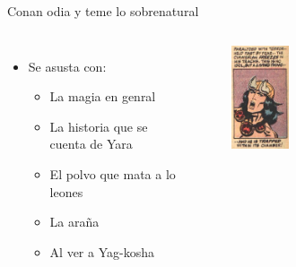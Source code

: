 \begin{frame}{Conan odia y teme lo sobrenatural}
\begin{columns}
 \begin{itemize}
    \item Se asusta con:
    \begin{itemize}
      \item La magia en genral
      \item La historia que se cuenta de Yara
      \item El polvo que mata a lo leones
      \item La araña
      \item Al ver a Yag-kosha
    \end{itemize}
 \end{itemize}
 \begin{figure}[htb]
    \centering
    \includegraphics[width=0.3\textwidth]{img/tropes/temor}
 \end{figure} 
 \end{columns}
\end{frame}

